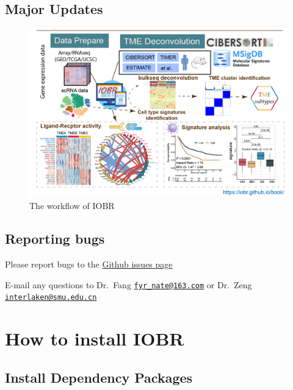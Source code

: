 \documentclass[
  12pt,
]{book}
\begin{document}
\hypertarget{major-updates}{%
\section{Major Updates}\label{major-updates}}

\begin{figure}

{\centering \includegraphics[width=0.95\linewidth]{./fig/IOBR-Workflow2} 

}

\caption{The workflow of IOBR}\label{fig:unnamed-chunk-2}
\end{figure}

\hypertarget{reporting-bugs}{%
\section{Reporting bugs}\label{reporting-bugs}}

Please report bugs to the \href{https://github.com/IOBR/IOBR/issues}{Github issues page}

E-mail any questions to Dr.~Fang \href{mailto:fyr_nate@163.com}{\nolinkurl{fyr\_nate@163.com}} or Dr.~Zeng \href{mailto:interlaken@smu.edu.cn}{\nolinkurl{interlaken@smu.edu.cn}}

\hypertarget{how-to-install-iobr}{%
\chapter{\texorpdfstring{\textbf{How to install IOBR}}{How to install IOBR}}\label{how-to-install-iobr}}

\hypertarget{install-dependency-packages}{%
\section{Install Dependency Packages}\label{install-dependency-packages}}
\end{document}
